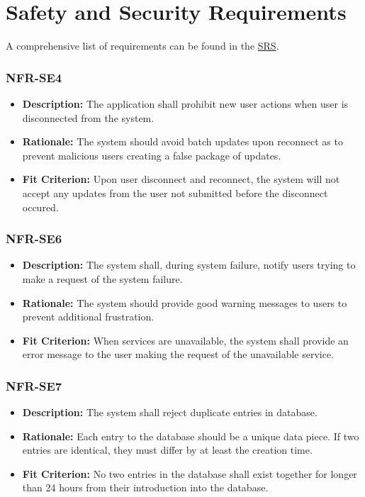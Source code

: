 \documentclass{article}
\begin{document}
\normalsize

\section{Safety and Security Requirements}

A comprehensive list of requirements can be found in the \href{https://github.com/OKKM-insights/OKKM.insights/blob/main/docs/SRS/SRS.pdf}{SRS}.

\subsubsection*{NFR-SE4}
\begin{itemize}
  \item \textbf{Description:} The application shall prohibit new user actions when user is disconnected from the system.
  \item \textbf{Rationale:} The system should avoid batch updates upon reconnect as to prevent malicious users creating a false package of updates.
  \item \textbf{Fit Criterion:} Upon user disconnect and reconnect, the system will not accept any updates from the user not submitted before the disconnect occured.
\end{itemize}

\subsubsection*{NFR-SE6}
\begin{itemize}
  \item \textbf{Description:} The system shall, during system failure, notify users trying to make a request of the system failure.
  \item \textbf{Rationale:} The system should provide good warning messages to users to prevent additional frustration.
  \item \textbf{Fit Criterion:} When services are unavailable, the system shall provide an error message to the user making the request of the unavailable service.
\end{itemize}

\subsubsection*{NFR-SE7}
\begin{itemize}
  \item \textbf{Description:} The system shall reject duplicate entries in database.
  \item \textbf{Rationale:} Each entry to the database should be a unique data piece. If two entries are identical, they must differ by at least the creation time.
  \item \textbf{Fit Criterion:} No two entries in the database shall exist together for longer than 24 hours from their introduction into the database.
\end{itemize}
\end{document}
